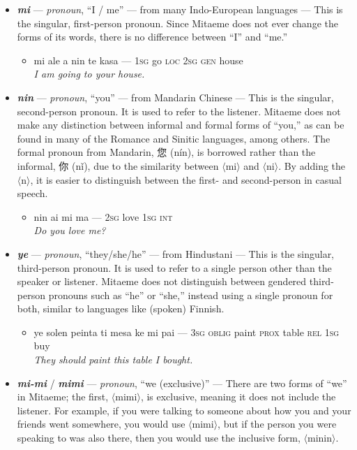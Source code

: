 \documentclass[a4paper, titlepage]{article}
\begin{document}
\begin{itemize}
	\item \textbf{\textit{mi}} — \textit{pronoun}, ``I / me'' — from many Indo-European languages — This is the singular, first-person pronoun. Since Mitaeme does not ever change the forms of its words, there is no difference between ``I'' and ``me.''
	\begin{itemize}
		\item mi ale a nin te kasa — \textsc{1sg} go \textsc{loc 2sg gen} house \\\textit{I am going to your house.}
	\end{itemize}
	\item \textbf{\textit{nin}} — \textit{pronoun}, ``you'' — from Mandarin Chinese — This is the singular, second-person pronoun. It is used to refer to the listener. Mitaeme does not make any distinction between informal and formal forms of ``you,'' as can be found in many of the Romance and Sinitic languages, among others. The formal pronoun from Mandarin, 您 (nín), is borrowed rather than the informal, 你 (nǐ), due to the similarity between $\langle$mi$\rangle$ and $\langle$ni$\rangle$. By adding the $\langle$n$\rangle$, it is easier to distinguish between the first- and second-person in casual speech.
	\begin{itemize}
		\item nin ai mi ma — \textsc{2sg} love \textsc{1sg int} \\\textit{Do you love me?}
	\end{itemize}
	\item \textbf{\textit{ye}} — \textit{pronoun}, ``they/she/he'' — from Hindustani — This is the singular, third-person pronoun. It is used to refer to a single person other than the speaker or listener. Mitaeme does not distinguish between gendered third-person pronouns such as ``he'' or ``she,'' instead using a single pronoun for both, similar to languages like (spoken) Finnish.
	\begin{itemize}
		\item ye solen peinta ti mesa ke mi pai — \textsc{3sg oblig} paint \textsc{prox} table \textsc{rel 1sg} buy \\\textit{They should paint this table I bought.}
	\end{itemize}
	\item \textbf{\textit{mi-mi}} / \textbf{\textit{mimi}} — \textit{pronoun}, ``we (exclusive)'' — There are two forms of ``we'' in Mitaeme; the first, $\langle$mimi$\rangle$, is exclusive, meaning it does not include the listener. For example, if you were talking to someone about how you and your friends went somewhere, you would use $\langle$mimi$\rangle$, but if the person you were speaking to was also there, then you would use the inclusive form, $\langle$minin$\rangle$.

\end{itemize}
\end{document}
